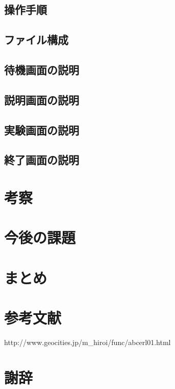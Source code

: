 \documentclass[11pt,a4paper]{jsarticle}
\begin{document}
\subsection{操作手順}
\subsection{ファイル構成}
\subsection{待機画面の説明}
\subsection{説明画面の説明}
\subsection{実験画面の説明}
\subsection{終了画面の説明}
\section{考察}
\section{今後の課題}
\section{まとめ}
\section{参考文献}
http://www.geocities.jp/m_hiroi/func/abcerl01.html
\section{謝辞}
%
%
\end{document}
